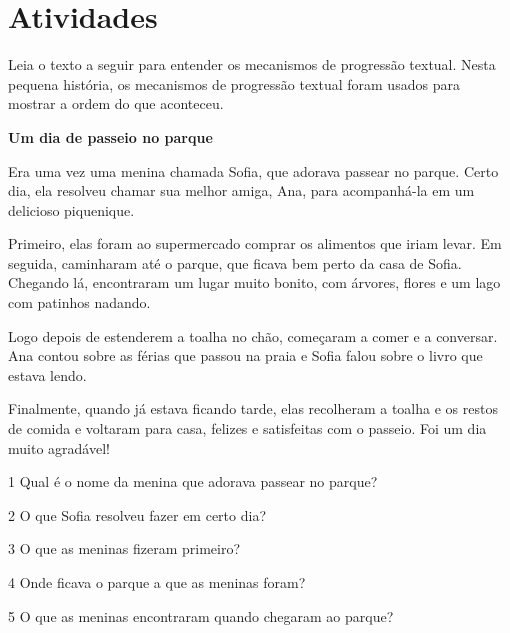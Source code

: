 \section*{Atividades}

Leia o texto a seguir para entender os mecanismos de progressão textual.
Nesta pequena história, os mecanismos de progressão textual foram usados para
mostrar a ordem do que aconteceu.

\begin{myquote}
\textbf{Um dia de passeio no parque}

Era uma vez uma menina chamada Sofia, que adorava passear no parque.
Certo dia, ela resolveu chamar sua melhor amiga, Ana, para
acompanhá-la em um delicioso piquenique.

Primeiro, elas foram ao supermercado comprar os alimentos que iriam
levar. Em seguida, caminharam até o parque, que ficava bem perto da casa
de Sofia. Chegando lá, encontraram um lugar muito bonito, com árvores,
flores e um lago com patinhos nadando.

Logo depois de estenderem a toalha no chão, começaram a comer e a
conversar. Ana contou sobre as férias que passou na praia e Sofia
falou sobre o livro que estava lendo.

Finalmente, quando já estava ficando tarde, elas recolheram a toalha e
os restos de comida e voltaram para casa, felizes e satisfeitas com o
passeio. Foi um dia muito agradável!

\end{myquote}


\num{1} Qual é o nome da menina que adorava passear no parque?


\num{2} O que Sofia resolveu fazer em certo dia?


\num{3} O que as meninas fizeram primeiro?


\num{4} Onde ficava o parque a que as meninas foram?



\num{5} O que as meninas encontraram quando chegaram ao parque?

